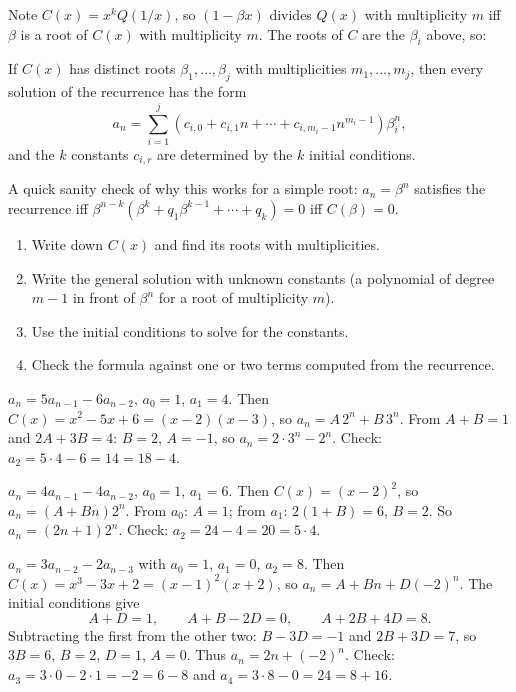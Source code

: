 Note $C(x) = x^kQ(1/x)$, so $(1-\beta x)$ divides $Q(x)$ with multiplicity $m$ iff $\beta$ is a
root of $C(x)$ with multiplicity $m$. The roots of $C$ are the $\beta_i$ above, so:

\begin{theorem}
If $C(x)$ has distinct roots $\beta_1,\dots,\beta_j$ with multiplicities $m_1,\dots,m_j$, then
every solution of the recurrence has the form
\[
a_n = \sum_{i=1}^{j}\left(c_{i,0} + c_{i,1}n + \cdots + c_{i,m_i-1}n^{m_i-1}\right)\beta_i^n,
\]
and the $k$ constants $c_{i,r}$ are determined by the $k$ initial conditions.
\end{theorem}

A quick sanity check of why this works for a simple root: $a_n = \beta^n$ satisfies the
recurrence iff $\beta^{n-k}(\beta^k + q_1\beta^{k-1} + \cdots + q_k) = 0$ iff $C(\beta) = 0$.

\begin{important}[Recipe]
\begin{enumerate}
  \item Write down $C(x)$ and find its roots with multiplicities.
  \item Write the general solution with unknown constants (a polynomial of degree $m-1$ in front
        of $\beta^n$ for a root of multiplicity $m$).
  \item Use the initial conditions to solve for the constants.
  \item Check the formula against one or two terms computed from the recurrence.
\end{enumerate}
\end{important}

\begin{example}
$a_n = 5a_{n-1} - 6a_{n-2}$, $a_0 = 1$, $a_1 = 4$. Then $C(x) = x^2 - 5x + 6 = (x-2)(x-3)$, so
$a_n = A\,2^n + B\,3^n$. From $A + B = 1$ and $2A + 3B = 4$: $B = 2$, $A = -1$, so
$a_n = 2\cdot3^n - 2^n$. Check: $a_2 = 5\cdot4 - 6 = 14 = 18 - 4$.
\end{example}

\begin{example}
$a_n = 4a_{n-1} - 4a_{n-2}$, $a_0 = 1$, $a_1 = 6$. Then $C(x) = (x-2)^2$, so
$a_n = (A + Bn)2^n$. From $a_0$: $A = 1$; from $a_1$: $2(1 + B) = 6$, $B = 2$. So
$a_n = (2n+1)2^n$. Check: $a_2 = 24 - 4 = 20 = 5 \cdot 4$.
\end{example}

\begin{example}
$a_n = 3a_{n-2} - 2a_{n-3}$ with $a_0 = 1$, $a_1 = 0$, $a_2 = 8$. Then
$C(x) = x^3 - 3x + 2 = (x-1)^2(x+2)$, so $a_n = A + Bn + D(-2)^n$. The initial conditions give
\[
A + D = 1,\qquad A + B - 2D = 0,\qquad A + 2B + 4D = 8.
\]
Subtracting the first from the other two: $B - 3D = -1$ and $2B + 3D = 7$, so $3B = 6$, $B = 2$,
$D = 1$, $A = 0$. Thus $a_n = 2n + (-2)^n$. Check: $a_3 = 3\cdot0 - 2\cdot1 = -2 = 6 - 8$ and
$a_4 = 3\cdot8 - 0 = 24 = 8 + 16$.
\end{example}

